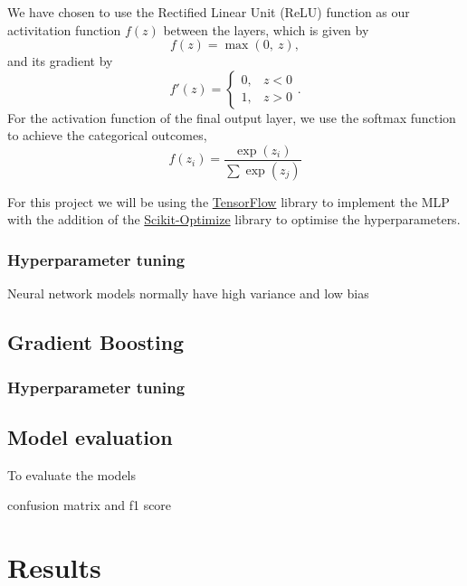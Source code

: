 \documentclass[a4paper, 11pt, twocolumn]{article}
\begin{document}
We have chosen to use the Rectified Linear Unit (ReLU) function as our 
activitation function $f(z)$ between the layers, which is given by 
\begin{equation}
      f(z) = \max (0,\ z),
\end{equation}
and its gradient by 
\begin{equation}
      f'(z) = 
      \begin{cases} 
            0, &  z<0\\
            1, &  z>0
      \end{cases}. 
\end{equation}
For the activation function of the final output layer, we use the softmax 
function to achieve the categorical outcomes,
\begin{equation}
      f(z_i)=\frac{\exp(z_i)}{\sum \exp(z_j)}
\end{equation}

For this project we will be using the \href{https://www.tensorflow.org/}
{TensorFlow} library to implement the MLP with the addition of the 
\href{https://scikit-optimize.github.io/}{Scikit-Optimize} library to optimise 
the hyperparameters.

\subsubsection{Hyperparameter tuning}
Neural network models normally have high variance and low bias


\subsection{Gradient Boosting}
\subsubsection{Hyperparameter tuning}


\subsection{Model evaluation}
To evaluate the models 

confusion matrix and f1 score

\section{Results}

\begin{table}
\centering
{}
\caption{Estimated hyperparameters for the neural network model employed in this project.}
\label{tab:Tune_NN}
\end{table}
\end{document}
